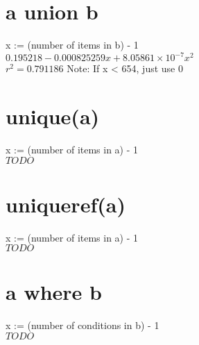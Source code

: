 \documentclass[12pt]{article}
\begin{document}
	\section{a union b}
	x := (number of items in b) - 1\\
	$0.195218 - 0.000825259 x + 8.05861 \times 10^{-7} x^2$\\
	$r^2 = 0.791186$
	Note: If x < 654, just use 0
	
	\section{unique(a)}
	x := (number of items in a) - 1\\
	$TODO$
	
	\section{uniqueref(a)}
	x := (number of items in a) - 1\\
	$TODO$
	
	\section{a where b}
	x := (number of conditions in b) - 1\\
	$TODO$
\end{document}
